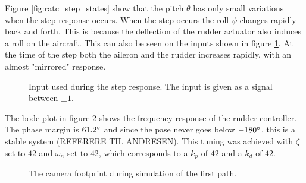 Figure \ref{fig:ratc_step_states} show that the pitch $\theta$ has only small variations when the step response occurs. When the step occurs the roll $\psi$ changes rapidly back and forth. This is because the deflection of the rudder actuator also induces a roll on the aircraft. This can also be seen on the inputs shown in figure \ref{fig:ratc_step_input}. At the time of the step both the aileron and the rudder increases rapidly, with an almost "mirrored" response.

\begin{figure}[]
    \centering
    \caption{Input used during the step response. The input is given as a signal between $\pm1$.}
	\label{fig:ratc_step_input}
\end{figure}

The bode-plot in figure \ref{fig:ratc_bode} shows the frequency response of the rudder controller. The phase margin is $61.2\degree$ and since the pase never goes below $-180\degree$, this is a stable system (REFERERE TIL ANDRESEN). This tuning was achieved with $\zeta$ set to $42$ and $\omega_n$ set to $42$, which corresponds to a $k_p$ of $42$ and a $k_d$ of $42$.

\begin{figure}[]
    \centering
    \caption{The camera footprint during simulation of the first path.}
	\label{fig:ratc_bode}
\end{figure}

